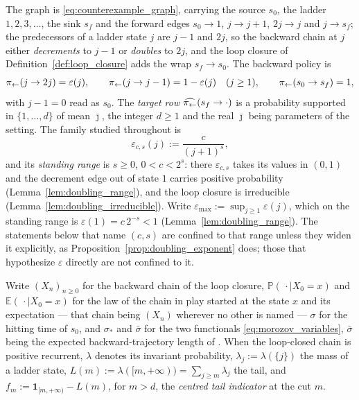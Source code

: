 \begin{definition}\label{def:doubling_setting}
The graph is \eqref{eq:counterexample_graph}, carrying the source $s_0$, the ladder
$1,2,3,\dots$, the sink $s_f$ and the forward edges $s_0\rightarrow1$, $j\rightarrow j+1$,
$2j\rightarrow j$ and $j\rightarrow s_f$; the predecessors of a ladder state $j$ are $j-1$ and
$2j$, so the backward chain at $j$ either \emph{decrements} to $j-1$ or \emph{doubles} to $2j$,
and the loop closure of Definition~\ref{def:loop_closure} adds the wrap $s_f\rightarrow s_0$.
The backward policy is
\begin{equation}\label{eq:doubling_policy}
    \pi_{\leftarrow}(j\rightarrow2j)=\varepsilon(j),\qquad
    \pi_{\leftarrow}(j\rightarrow j-1)=1-\varepsilon(j)\quad(j\geq1),\qquad
    \pi_{\leftarrow}(s_0\rightarrow s_f)=1,
\end{equation}
with $j-1=0$ read as $s_0$. The \emph{target row} $\widehat{\pi_{\leftarrow}}(s_f\rightarrow\cdot)$
is a probability supported in $\{1,\dots,d\}$ of mean $\bar\jmath$, the integer $d\geq1$ and the
real $\bar\jmath$ being parameters of the setting. The family studied throughout is
\begin{equation}\label{eq:doubling_family}
    \varepsilon_{c,s}(j):=\frac{c}{(j+1)^s},
\end{equation}
and its \emph{standing range} is $s\geq0$, $0<c<2^s$: there $\varepsilon_{c,s}$ takes its values
in $(0,1)$ and the decrement edge out of state $1$ carries positive probability
(Lemma~\ref{lem:doubling_range}), and the loop closure is irreducible
(Lemma~\ref{lem:doubling_irreducible}). Write $\varepsilon_{\max}:=\sup_{j\geq1}\varepsilon(j)$,
which on the standing range is $\varepsilon(1)=c\,2^{-s}<1$
(Lemma~\ref{lem:doubling_range}). The statements below that name
$(c,s)$ are confined to that range unless they widen it explicitly, as
Proposition~\ref{prop:doubling_exponent} does; those that hypothesize $\varepsilon$ directly
are not confined to it.

Write $(X_n)_{n\geq0}$ for the backward chain of the loop closure, $\mathbb P(\,\cdot\mid X_0=x)$
and $\mathbb E(\,\cdot\mid X_0=x)$ for the law of the chain in play started at the state $x$ and
its expectation --- that chain being $(X_n)$ wherever no other is named --- $\sigma$ for the hitting time of $s_0$,
and $\sigma_*$ and $\bar\sigma$ for the two functionals \eqref{eq:morozov_variables},
$\bar\sigma$ being the expected backward-trajectory length of \citet{morozov2025revisiting}.
When the loop-closed chain is positive recurrent, $\lambda$ denotes its invariant probability,
$\lambda_j:=\lambda(\{j\})$ the mass of a ladder state,
$L(m):=\lambda([m,+\infty))=\sum_{j\geq m}\lambda_j$ the tail, and
$f_m:=\mathbf 1_{[m,+\infty)}-L(m)$, for $m>d$, the \emph{centred tail indicator} at the cut $m$.


\end{definition}
